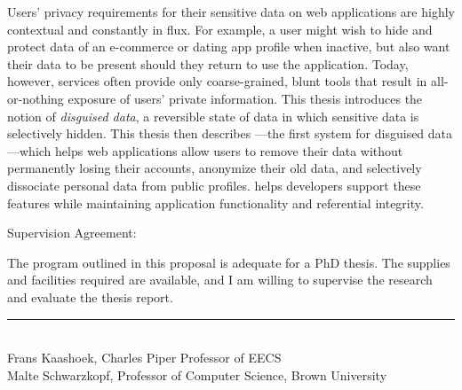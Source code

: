 \vspace{1em}
\begin{minipage}{\dimexpr\textwidth-1cm}

\noindent 
Users' privacy requirements for their sensitive data on web applications are
highly contextual and constantly in flux. For example, a user might wish to hide
and protect data of an e-commerce or dating app profile when inactive, but also
want their data to be present should they return to use the application. 
%
Today, however, services often provide only coarse-grained, blunt tools that
result in all-or-nothing exposure of users’ private information.
%
This thesis introduces the notion of \emph{disguised data}, a reversible state
of data in which sensitive data is selectively hidden.
%
This thesis then describes \sys---the first system for disguised data---which
helps web applications allow users to remove their data without permanently
losing their accounts, anonymize their old data, and selectively dissociate
personal data from public profiles.
%
\sys helps developers support these features while maintaining application
functionality and referential integrity.
%

\end{minipage}

\vspace{1em}
\noindent Supervision Agreement:

\vspace{1em}
\begin{minipage}{\dimexpr\textwidth-1cm}
\noindent The program outlined in this proposal is adequate for a PhD thesis. The
supplies and facilities required are available, and I am willing to supervise
the research and evaluate the thesis report.
\end{minipage}

\vspace{2em}
\begin{flushright}
    \rule{0.7\linewidth}{0.1pt}\\
    {\normalsize Frans Kaashoek, Charles Piper Professor of EECS}\\
    {\normalsize Malte Schwarzkopf, Professor of Computer Science, Brown University}
\end{flushright}

